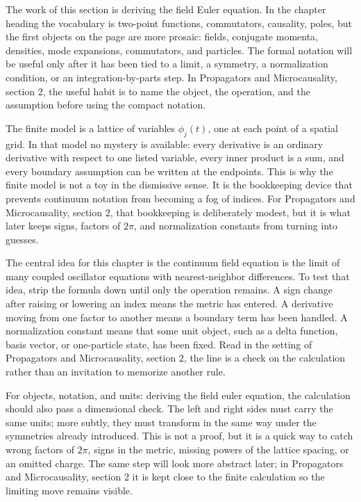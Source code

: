 The work of this section is deriving the field Euler equation.  In the chapter heading the vocabulary is two-point functions, commutators, causality, poles, but the first objects on the page are more prosaic: fields, conjugate momenta, densities, mode expansions, commutators, and particles.  The formal notation will be useful only after it has been tied to a limit, a symmetry, a normalization condition, or an integration-by-parts step.  In Propagators and Microcausality, section 2, the useful habit is to name the object, the operation, and the assumption before using the compact notation.

The finite model is a lattice of variables \(\phi_j(t)\), one at each point of a spatial grid.  In that model no mystery is available: every derivative is an ordinary derivative with respect to one listed variable, every inner product is a sum, and every boundary assumption can be written at the endpoints.  This is why the finite model is not a toy in the dismissive sense.  It is the bookkeeping device that prevents continuum notation from becoming a fog of indices.  For Propagators and Microcausality, section 2, that bookkeeping is deliberately modest, but it is what later keeps signs, factors of \(2\pi\), and normalization constants from turning into guesses.

The central idea for this chapter is the continuum field equation is the limit of many coupled oscillator equations with nearest-neighbor differences.  To test that idea, strip the formula down until only the operation remains.  A sign change after raising or lowering an index means the metric has entered.  A derivative moving from one factor to another means a boundary term has been handled.  A normalization constant means that some unit object, such as a delta function, basis vector, or one-particle state, has been fixed.  Read in the setting of Propagators and Microcausality, section 2, the line is a check on the calculation rather than an invitation to memorize another rule.

For objects, notation, and units: deriving the field euler equation, the calculation should also pass a dimensional check.  The left and right sides must carry the same units; more subtly, they must transform in the same way under the symmetries already introduced.  This is not a proof, but it is a quick way to catch wrong factors of \(2\pi\), signs in the metric, missing powers of the lattice spacing, or an omitted charge.  The same step will look more abstract later; in Propagators and Microcausality, section 2 it is kept close to the finite calculation so the limiting move remains visible.

